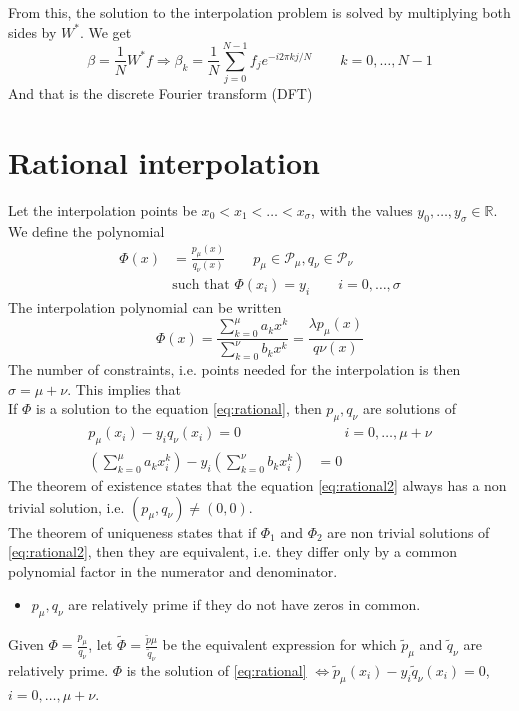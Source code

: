 \documentclass[12pt, openany]{report}
\newcommand{\R}{\mathbb{R}}
\theoremstyle{definition}
\begin{document}
From this, the solution to the interpolation problem is solved by multiplying both sides by \(W^*\). We get 
\begin{equation}
    \beta = \frac{1}{N}W^*f \Longrightarrow \beta_k = \frac{1}{N}\sum_{j=0}^{N-1}f_j e^{-i2\pi kj/N} \qquad k=0,\dots,N-1
\end{equation}
And that is the discrete Fourier transform (DFT)
\section{Rational interpolation}
Let the interpolation points be \(x_0< x_1<\dots<x_\sigma\), with the values \(y_0,\dots,y_\sigma\in\R\). We define the polynomial
\begin{align}\label{eq:rational}
    \Phi(x) &= \frac{p_\mu(x)}{q_\nu(x)} \qquad p_\mu \in\mathcal{P}_\mu, q_\nu\in \mathcal{P}_\nu\\
    &\text{such that } \Phi(x_i)=y_i\qquad i = 0,\dots,\sigma
\end{align}
The interpolation polynomial can be written 
\begin{equation}
    \Phi(x) = \frac{\sum_{k=0}^\mu a_kx^k}{\sum_{k=0}^\nu b_kx^k} = \frac{\lambda p_\mu(x)}{q\nu(x)}
\end{equation}
The number of constraints, i.e. points needed for the interpolation is then \(\sigma=\mu +\nu\). This implies that\\
If \(\Phi\) is a solution to the equation \eqref{eq:rational}, then \(p_\mu,q_\nu\) are solutions of 
\begin{align}\label{eq:rational2}
    p_\mu(x_i) - y_i q_\nu(x_i) = 0&\qquad i = 0,\dots,\mu + \nu\\
    \left(\sum_{k=0}^\mu a_kx_i^k\right) - y_i\left(\sum_{k=0}^\nu b_kx_i^k\right) &= 0
\end{align}
The theorem of existence states that the equation \eqref{eq:rational2} always has a non trivial solution, i.e. \((p_\mu,q_\nu) \neq (0,0)\). \\
The theorem of uniqueness states that if \(\Phi_1\) and \(\Phi_2\) are non trivial solutions of \eqref{eq:rational2}, then they are equivalent, i.e. they differ only by a common polynomial factor in the numerator and denominator.\\

\begin{itemize}
    \item \(p_\mu,q_\nu\) are relatively prime if they do not have zeros in common.
\end{itemize}
Given \(\Phi = \frac{p_\mu}{q_\nu}\), let \(\tilde{\Phi}=\frac{\tilde{p}\mu}{\tilde{q}_\nu}\) be the equivalent expression for which \(\tilde{p}_\mu\) and \(\tilde{q}_\nu\) are relatively prime. \(\Phi\) is the solution of \eqref{eq:rational} \(\Longleftrightarrow \tilde{p}_\mu(x_i)-y_i \tilde{q}_\nu(x_i)=  0\), \(i=0,\dots,\mu+\nu\).  
\end{document}
